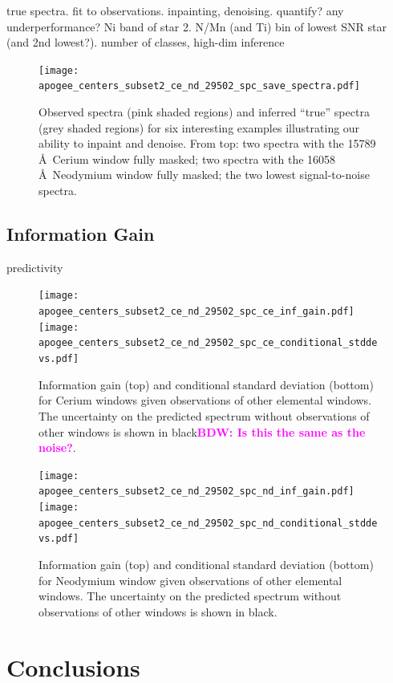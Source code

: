 \documentclass[a4paper,fleqn,usenatbib]{mnras}
\newcommand{\bdw}[1]{\textbf{\textcolor{magenta}{BDW: #1}}}
\begin{document}
true spectra. fit to observations. inpainting, denoising. quantify? any underperformance? Ni band of star 2. N/Mn (and Ti) bin of lowest SNR star (and 2nd lowest?).
number of classes, high-dim inference

\begin{figure}
	\texttt{[image: apogee\_centers\_subset2\_ce\_nd\_29502\_spc\_save\_spectra.pdf]}
    \caption{Observed spectra (pink shaded regions) and inferred ``true'' spectra (grey shaded regions) for six interesting examples illustrating our ability to inpaint and denoise. From top: two spectra with the 15789 \AA\ Cerium window fully masked; two spectra with the 16058 \AA\ Neodymium window fully masked; the two lowest signal-to-noise spectra.}
    \label{fig:inpainting_denoising_examples}
\end{figure}

\subsection{Information Gain}

predictivity

\begin{figure}
	\texttt{[image: apogee\_centers\_subset2\_ce\_nd\_29502\_spc\_ce\_inf\_gain.pdf]}
	\texttt{[image: apogee\_centers\_subset2\_ce\_nd\_29502\_spc\_ce\_conditional\_stddevs.pdf]}
    \caption{Information gain (top) and conditional standard deviation (bottom) for Cerium windows given observations of other elemental windows. The uncertainty on the predicted spectrum without observations of other windows is shown in black\bdw{Is this the same as the noise?}.}
    \label{fig:ce_information}
\end{figure}

\begin{figure}
	\texttt{[image: apogee\_centers\_subset2\_ce\_nd\_29502\_spc\_nd\_inf\_gain.pdf]}
	\texttt{[image: apogee\_centers\_subset2\_ce\_nd\_29502\_spc\_nd\_conditional\_stddevs.pdf]}
    \caption{Information gain (top) and conditional standard deviation (bottom) for Neodymium window given observations of other elemental windows. The uncertainty on the predicted spectrum without observations of other windows is shown in black.}
    \label{fig:nd_information}
\end{figure}




\section{Conclusions}
\end{document}

